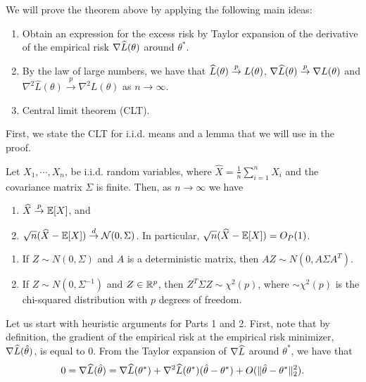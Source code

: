 
We will prove the theorem above by applying the following main ideas:
\begin{enumerate}
    \item Obtain an expression for the excess risk by Taylor expansion of the derivative of the empirical risk $\nabla \widehat{L}(\theta)$ around $\theta^{*}$.
    \item By the law of large numbers, we have that $\widehat{L}(\theta) \overset{p}{\to} L(\theta)$, $\nabla\widehat{L}(\theta) \overset{p}{\to} \nabla L(\theta)$   and  $\nabla^{2}\hat{L}(\theta) \overset{p}{\to} \nabla^{2} L(\theta)$ as $n \to \infty$.
    
    \item Central limit theorem (CLT).
\label{ideas}
\end{enumerate}
 
First, we state the CLT for i.i.d. means and a lemma that we will use in the proof.

\begin{theorem} \label{lec1:thm:CLT}
Let $X_1, \cdots, X_n$, be i.i.d. random variables, where $\widehat{X}=\frac{1}{n} \sum_{i=1}^{n} X_i$ and the covariance matrix $\Sigma$ is finite. Then, as $n \to \infty$ we have
\begin{enumerate}
    \item $\widehat{X} \overset{p}{\to} \mathbb{E}[X]$, and
    \item $\sqrt{n} (\widehat{X}-\mathbb{E}[X]) \overset{d}{\to} \mathcal{N}(0,\Sigma)$. In particular, $\sqrt{n} (\widehat{X}-\mathbb{E}[X]) = O_P(1)$.
\end{enumerate}
\end{theorem}

\begin{lemma}\label{lec1:lem:dist}
\quad\quad
    \begin{enumerate}
        \item If $Z \sim N(0, \Sigma)$ and $A$ is a deterministic matrix, then $AZ \sim N(0, A \Sigma A^T)$.
        
        \item If $Z \sim N(0, \Sigma^{-1})$ and $Z \in \mathbb R^p$, then $Z^T \Sigma Z \sim \chi^2(p)$, where $\sim \chi^2(p)$ is the chi-squared distribution with $p$ degrees of freedom.
    \end{enumerate}
\end{lemma}


Let us start with heuristic arguments for Parts 1 and 2. First, note that by definition, the gradient of the empirical risk at the empirical risk minimizer, $\nabla \widehat{L}(\hat{\theta})$, is equal to $0$. From the Taylor expansion of $\nabla \widehat{L}$ around $\theta^*$, we have that 
\begin{align}
    0 = \nabla \widehat{L}(\hat{\theta}) = \nabla \widehat{L}(\theta^*) + \nabla^2 \widehat{L}(\theta^*)(\hat{\theta} - \theta^*) + O(\|\hat{\theta} - \theta^*\|^2_2).
\end{align}

